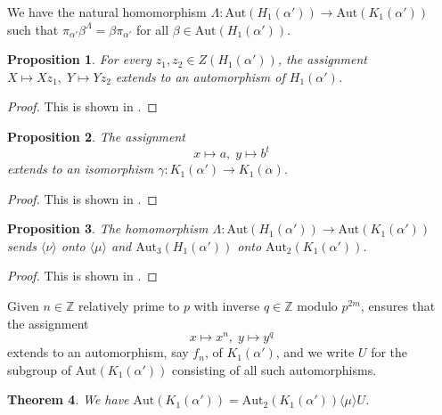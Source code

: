 \documentclass{amsart}
\newtheorem{theorem}{Theorem}[section]
\newtheorem{prop}[theorem]{Proposition}
\theoremstyle{definition}
\theoremstyle{remark}
\newcommand \Z{{\mathbb Z}}
\begin{document}
We have the natural homomorphism $\Lambda:\mathrm{Aut}(H_1(\alpha'))\to \mathrm{Aut}(K_1(\alpha'))$ such that
$\pi_{\alpha'}\beta^\Lambda= \beta\pi_{\alpha'}$ for all $\beta\in \mathrm{Aut}(H_1(\alpha'))$.

\begin{prop}\label{authh} For every $z_1,z_2\in Z(H_1(\alpha'))$, the assignment $X\mapsto Xz_1,\; Y\mapsto Yz_2$
extends to an automorphism of $H_1(\alpha')$.
\end{prop}

\begin{proof} This is shown in \cite[Proposition 3.1]{MS2}.
\end{proof}

\begin{prop}\label{suf2} The assignment
\begin{equation}
\label{cta}
x\mapsto a,\; y\mapsto b^t
\end{equation}
extends to an isomorphism $\gamma:K_1(\alpha')\to K_1(\alpha)$.
\end{prop}

\begin{proof} This is shown in \cite[Proposition 2.6]{MS2}.
\end{proof}



\begin{prop}\label{tet} The homomorphism
$\Lambda:\mathrm{Aut}(H_1(\alpha'))\to \mathrm{Aut}(K_1(\alpha'))$ sends $\langle\nu\rangle$ onto $\langle\mu\rangle$
and $\mathrm{Aut}_3(H_1(\alpha'))$ onto
$\mathrm{Aut}_2(K_1(\alpha'))$.
\end{prop}

\begin{proof} This is shown in \cite[Proposition 3.4]{MS2}.
\end{proof}

Given $n\in\Z$ relatively prime to $p$ with inverse $q\in\Z$ modulo $p^{2m}$, \cite[Proposition 2.3]{MS2} ensures
that the assignment
\begin{equation*}
x\mapsto x^n,\; y\mapsto y^q
\end{equation*}
extends to an automorphism, say $f_n$, of $K_1(\alpha')$, and we write $U$ for the subgroup of $\mathrm{Aut}(K_1(\alpha'))$
consisting of all such automorphisms.


\begin{theorem}\label{autk6} We have  $\mathrm{Aut}(K_1(\alpha'))=\mathrm{Aut}_2(K_1(\alpha'))\langle \mu \rangle U$.
\end{theorem}
\end{document}

